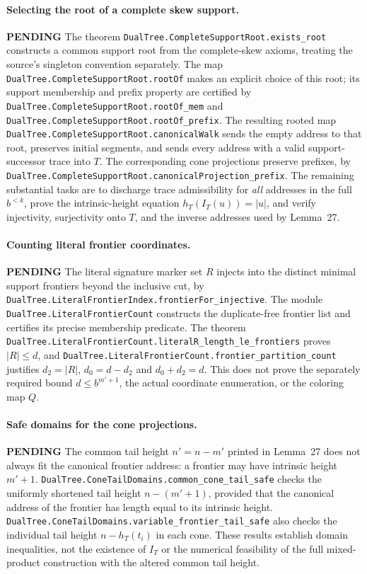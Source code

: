 \documentclass[11pt]{article}
\newcommand{\todo}{\textcolor{gray!70!black}{\textbf{PENDING}}}
\newcommand{\lean}[1]{\texttt{#1}}
\begin{document}
\paragraph{Selecting the root of a complete skew support.} \todo
The theorem \lean{DualTree.CompleteSupportRoot.exists_root}
constructs a common support root from the complete-skew axioms,
treating the source's singleton convention separately.
The map \lean{DualTree.CompleteSupportRoot.rootOf} makes an explicit
choice of this root; its support membership and prefix property
are certified by \lean{DualTree.CompleteSupportRoot.rootOf_mem}
and \lean{DualTree.CompleteSupportRoot.rootOf_prefix}.
The resulting rooted map
\lean{DualTree.CompleteSupportRoot.canonicalWalk}
sends the empty address to that root, preserves initial segments,
and sends every address with a valid support-successor trace
into $T$.  The corresponding cone projections preserve prefixes,
by \lean{DualTree.CompleteSupportRoot.canonicalProjection_prefix}.
The remaining substantial tasks are to discharge trace admissibility
for \emph{all} addresses in the full $b^{<k}$, prove the
intrinsic-height equation $h_T(I_T(u))=|u|$, and verify
injectivity, surjectivity onto $T$, and the inverse addresses used
by Lemma~27.


\paragraph{Counting literal frontier coordinates.} \todo
The literal signature marker set $R$ injects into the distinct
minimal support frontiers beyond the inclusive cut, by
\lean{DualTree.LiteralFrontierIndex.frontierFor_injective}.
The module \lean{DualTree.LiteralFrontierCount} constructs the
duplicate-free frontier list and certifies its precise membership
predicate.  The theorem
\lean{DualTree.LiteralFrontierCount.literalR_length_le_frontiers}
proves $|R|\le d$, and
\lean{DualTree.LiteralFrontierCount.frontier_partition_count}
justifies $d_2=|R|$, $d_0=d-d_2$ and $d_0+d_2=d$.
This does not prove the separately required bound
$d\le b^{m'+1}$, the actual coordinate enumeration, or the
coloring map $Q$.

\paragraph{Safe domains for the cone projections.} \todo
The common tail height $n'=n-m'$ printed in Lemma~27
does not always fit the canonical frontier address:
a frontier may have intrinsic height $m'+1$.
\lean{DualTree.ConeTailDomains.common_cone_tail_safe}
checks the uniformly shortened tail height $n-(m'+1)$,
provided that the canonical address of the frontier has
length equal to its intrinsic height.
\lean{DualTree.ConeTailDomains.variable_frontier_tail_safe}
also checks the individual tail height $n-h_T(t_i)$
in each cone.  These results establish domain inequalities,
not the existence of $I_T$ or the numerical feasibility of
the full mixed-product construction with the altered
common tail height.
\end{document}
